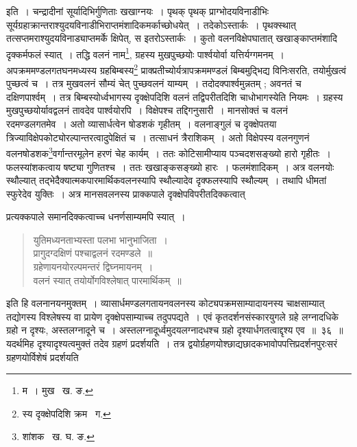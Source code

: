 \documentclass[11pt, openany]{book}
\begin{document}
\noindent इति~। चन्द्रादीनां सूर्यादिभिर्गुणिताः खखाग्नयः~। पृथक् पृथक् प्राग्भोदयविनाडीभिः सूर्यग्रहाक्रान्तराश्युदयविनाडीभिराप्तमंशादिकमर्काच्छोधयेत्~। तदेकोऽस्तार्कः~। पृथक्स्थात् तत्सप्तमराश्युदयविनाड्याप्तमर्के क्षिपेत्,
स इतरोऽस्तार्कः~। कुतो वलनविक्षेपघातात् खखाङ्काप्तमंशादि दृक्कर्मफलं स्यात्~। तद्धि वलनं नाम\renewcommand{\thefootnote}{३}\footnote{म~। मुख \textendash\ ख. ङ.}, ग्रहस्य मुखपुच्छयोः पार्श्वयोर्वा यत्तिर्यग्गमनम्~। अपक्रममण्डलगतघनमध्यस्य ग्रहबिम्बस्य\renewcommand{\thefootnote}{४}\footnote{स्य दृक्क्षेपदिशि क्रम \textendash\ ग.} प्राक्प्रतीच्योर्यत्रापक्रममण्डलं बिम्बमुद्भिद्य विनिःसरति, तयोर्मुखत्वं पुच्छत्वं च~। तत्र मुखवलनं सौम्यं चेत् पुच्छवलनं याम्यम्~। तदोदक्पार्श्वमुन्नतम् ; अवनतं च दक्षिणपार्श्वम्~। तत्र बिम्बस्योर्ध्वभागस्य दृक्क्षेपदिशि वलनं तद्विपरीतदिशि चाधोभागस्येति नियमः~। ग्रहस्य मुखपुच्छयोर्यावद्वलनं तावदेव पार्श्वयोरपि~। विक्षेपश्च तद्दिगनुसारी~। मानसोक्तं च वलनं रदमण्डलगतमेव~। अतो व्यासार्धत्वेन षोडशकं गृहीतम्~। वलनाङ्गुलं च दृक्क्षेपतया त्रिज्याविक्षेपकोट्योरल्पान्तरत्वादुपेक्षितं च~। तत्साधनं त्रैराशिकम्~। अतो विक्षेपस्य वलनगुणनं वलनषोडशक\renewcommand{\thefootnote}{५}\footnote{शांशक \textendash\ ख. घ. ङ.}वर्गान्तरमूलेन हरणं चेह कार्यम्~। ततः कोटिसामीप्याय पञ्चदशसङ्ख्यो हारो गृहीतः~। फलस्यांशकत्वाय षष्ट्या गुणितश्च~। ततः खखाङ्कसङ्ख्यो हारः~। फलमंशादिकम्~। अत्र वलनयोः स्थौल्यात् तद्भेदैक्यात्मकपारमार्थिकवलनस्यापि स्थौल्यादेव दृक्फलस्यापि स्थौल्यम्~। तथापि धीमतां स्फुरेदेव युक्तिः~। अत्र मानसवलनस्य प्राक्कपाले दृक्क्षेपविपरीतदिक्कत्वात् 

\newpage

\noindent प्रत्यक्कपाले समानदिक्कत्वाच्च धनर्णसाम्यमपि स्यात्~।
\begin{quote}
{\qt युतिमध्यनताभ्यस्ता पलभा भानुभाजिता~।\\
  प्रागुदग्दक्षिणं पश्चाद्वलनं रदमण्डले~॥\\
ग्रहेणायनयोरल्पमन्तरं द्विघ्नमायनम्~।\\
वलनं स्यात् तयोर्योगविश्लेषात् पारमार्थिकम्~॥}
\end{quote}

\noindent इति हि वलनानयनमुक्तम्~। व्यासार्धमण्डलगतायनवलनस्य कोट्यपक्रमसाम्यादायनस्य चाक्षसाम्यात् तद्योगस्य विश्लेषस्य वा प्रायेण दृक्क्षेपसाम्याच्च तदुपपद्यते~। एवं कृतदर्शनसंस्कारयुगले ग्रहे लग्नादधिके ग्रहो न दृश्यः, अस्तलग्नादूने च~। अस्तलग्नादूर्ध्वमुदयलग्नादधश्च ग्रहो दृश्यार्धगतत्वाद्दृश्य एव~॥~३६~॥ \\

\indent यदर्थमिह दृश्यादृश्यत्वमुक्तं तदेव ग्रहणं प्रदर्शयति~। तत्र द्वयोर्ग्रहणयोश्छाद्यछादकभावोपपत्तिप्रदर्शनपुरःसरं 
ग्रहणयोर्विशेषं प्रदर्शयति\textendash 
\end{document}
